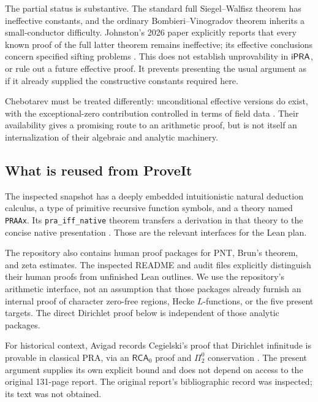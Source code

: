 The partial status is substantive. The standard full Siegel--Walfisz theorem has ineffective constants, and the ordinary Bombieri--Vinogradov theorem inherits a small-conductor difficulty. Johnston's 2026 paper explicitly reports that every known proof of the full latter theorem remains ineffective; its effective conclusions concern specified sifting problems \cite{Johnston2026}. This does not establish unprovability in $\mathsf{iPRA}$, or rule out a future effective proof. It prevents presenting the usual argument as if it already supplied the constructive constants required here.

Chebotarev must be treated differently: unconditional effective versions do exist, with the exceptional-zero contribution controlled in terms of field data \cite{ThornerZaman2019}. Their availability gives a promising route to an arithmetic proof, but is not itself an internalization of their algebraic and analytic machinery.

\subsection{What is reused from ProveIt}

The inspected snapshot has a deeply embedded intuitionistic natural deduction calculus, a type of primitive recursive function symbols, and a theory named \texttt{PRAAx}. Its \texttt{pra\_iff\_native} theorem transfers a derivation in that theory to the concise native presentation \cite{ProveItPR,ProveItBridge}. Those are the relevant interfaces for the Lean plan.

The repository also contains human proof packages for PNT, Brun's theorem, and zeta estimates. The inspected README and audit files explicitly distinguish their human proofs from unfinished Lean outlines. We use the repository's arithmetic interface, not an assumption that those packages already furnish an internal proof of character zero-free regions, Hecke $L$-functions, or the five present targets. The direct Dirichlet proof below is independent of those analytic packages.

For historical context, Avigad records Cegielski's proof that Dirichlet infinitude is provable in classical PRA, via an $\mathsf{RCA}_0$ proof and $\Pi^0_2$ conservation \cite{Avigad2003,Cegielski1992}. The present argument supplies its own explicit bound and does not depend on access to the original 131-page report. The original report's bibliographic record was inspected; its text was not obtained.


